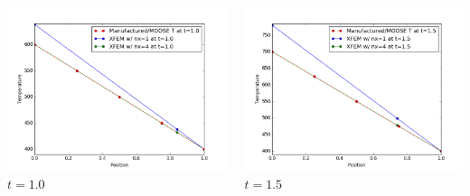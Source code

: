 \documentclass[]{beamer}
\begin{document}
\begin{frame}[t]
\begin{columns}
\begin{center}
			\includegraphics[scale=0.17]{figures/1D_xy_h1m/1D_xy_homog1mat_u_vs_x_10}\\
			$t=1.0$
			\end{center}
			\begin{center}
			\includegraphics[scale=0.17]{figures/1D_xy_h1m/1D_xy_homog1mat_u_vs_x_15}\\
			$t=1.5$			
			
			\null
			

\end{center}
\end{columns}
\end{frame}
\end{document}
